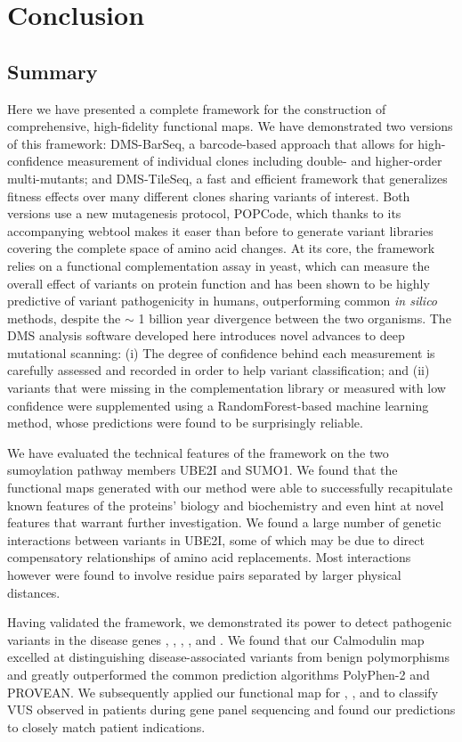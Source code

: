 
\chapter{Conclusion}

\section{Summary}

Here we have presented a complete framework for the construction of comprehensive, high-fidelity functional maps. We have demonstrated two versions of this framework: DMS-BarSeq, a barcode-based approach that allows for high-confidence measurement of individual clones including double- and higher-order multi-mutants; and DMS-TileSeq, a fast and efficient framework that generalizes fitness effects over many different clones sharing variants of interest. Both versions use a new mutagenesis protocol, POPCode, which thanks to its accompanying webtool makes it easer than before to generate variant libraries covering the complete space of amino acid changes. At its core, the framework relies on a functional complementation assay in yeast, which can measure the overall effect of variants on protein function and has been shown to be highly predictive of variant pathogenicity in humans, outperforming common \textit{in silico} methods, despite the $\sim$ 1 billion year divergence between the two organisms. 
The DMS analysis software developed here introduces novel advances to deep mutational scanning: (i) The degree of confidence behind each measurement is carefully assessed and recorded in order to help variant classification; and (ii) variants that were missing in the complementation library or measured with low confidence were supplemented using a RandomForest-based machine learning method, whose predictions were found to be surprisingly reliable. 

We have evaluated the technical features of the framework on the two sumoylation pathway members UBE2I and SUMO1. We found that the functional maps generated with our method were able to successfully recapitulate known features of the proteins' biology and biochemistry and even hint at novel features that warrant further investigation. We found a large number of genetic interactions between variants in UBE2I, some of which may be due to direct compensatory relationships of amino acid replacements. Most interactions however were found to involve residue pairs separated by larger physical distances.

Having validated the framework, we demonstrated its power to detect pathogenic variants in the disease genes , , , , and .  
We found that our Calmodulin map excelled at distinguishing disease-associated variants from benign polymorphisms and greatly outperformed the common prediction algorithms PolyPhen-2 and PROVEAN. We subsequently applied our functional map for , , and  to classify VUS observed in patients during gene panel sequencing and found our predictions to closely match patient indications.

